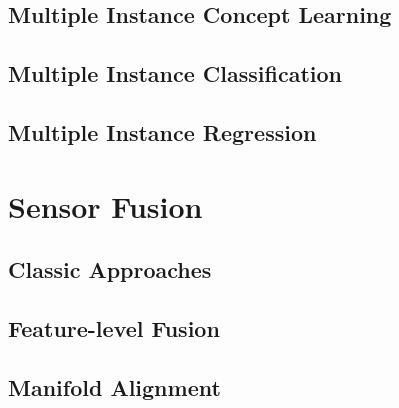 \subsection{Multiple Instance Concept Learning}

\subsection{Multiple Instance Classification}

\subsection{Multiple Instance Regression}


\section{Sensor Fusion}
	
	\subsection{Classic Approaches}
	
%		
%		
%		
		
	\subsection{Feature-level Fusion}
	
	\subsection{Manifold Alignment}
	

